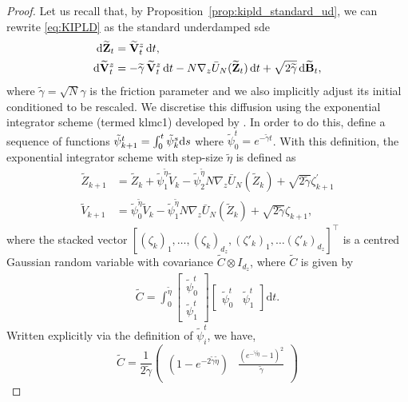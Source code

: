 \begin{proof}
 Let us recall that, by Proposition~\ref{prop:kipld_standard_ud}, we can rewrite \eqref{eq:KIPLD} as the standard underdamped \gls*{sde}
\begin{align*}
{\mathrm d} \widetilde{{\mathbf Z}}_t &= \widetilde{{\mathbf V}}_t^z\,{\mathrm d} t, \\
{\mathrm d} \widetilde{{\mathbf V}}_t^z &= -\widetilde{\gamma}\,\widetilde{{\mathbf V}}_t^z\,{\mathrm d} t
- N\nabla_z \bar U_N(\widetilde{{\mathbf Z}}_t)\,{\mathrm d} t
+ \sqrt{2\widetilde{\gamma}}\,{\mathrm d} \widetilde{{\mathbf B}}_t,
\end{align*}
where $\tilde{\gamma} = \sqrt{N} \gamma$ is the friction parameter and we also implicitly adjust its initial conditioned to be rescaled. We discretise this diffusion using the exponential integrator scheme (termed \gls*{klmc1}) developed by \citep{dalalyan2018sampling}. In order to do this, define a sequence of functions $\tilde{\psi}_{k+1}^t = \int_0^t \tilde{\psi}_k^s {\mathrm d} s$ where $\tilde{\psi}_0^t = e^{-\tilde{\gamma} t}$. With this definition, the exponential integrator scheme with step-size $\tilde{\eta}$ is defined as
\begin{align*}
\widetilde{Z}_{k+1} &= \widetilde{Z}_k + \tilde{\psi}_1^{\tilde{\eta}} \tilde{V}_k - \tilde{\psi}_2^{\tilde{\eta}} N\nabla_z \bar{U}_N(\widetilde{Z}_k) + \sqrt{2\tilde{\gamma}}\zeta_{k+1}^\prime\\
\widetilde{V}_{k+1} &= \tilde{\psi}_0^{\tilde{\eta}} \widetilde{V}_k - \tilde{\psi}_1^{\tilde{\eta}} N \nabla_z \bar{U}_N(\tilde{Z}_k) + \sqrt{2\tilde{\gamma}} \zeta_{k+1},
\end{align*}
where the stacked vector $[(\zeta_k)_1, \dots, (\zeta_k)_{d_z},(\zeta'_k)_1, \dots (\zeta'_k)_{d_z}]^\top$ is a centred Gaussian random variable with covariance $\widetilde{C}\otimes I_{d_z}$, where $\widetilde{C}$ is given by
\begin{align*}
\widetilde{C} = \int_0^{\tilde{\eta}} \begin{bmatrix} \tilde{\psi}_0^t \\ \tilde{\psi}_1^t \end{bmatrix} \begin{bmatrix} \tilde{\psi}_0^t & \tilde{\psi}_1^t \end{bmatrix} \mathrm{d}t.
\end{align*}
Written explicitly via the definition of $\tilde{\psi}_i^t$, we have,
\small
\begin{equation*}
\widetilde{C}= \frac{1}{2\tilde{\gamma}} \begin{pmatrix}
    (1-e^{-2\tilde{\gamma}\tilde{\eta}}) &  \frac{(e^{-\tilde{\gamma}\tilde{\eta}} -1)^2}{\tilde{\gamma}} \\

\end{pmatrix}
\end{equation*}
\end{proof}
